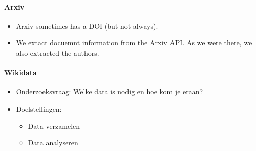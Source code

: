 \documentclass{ou-report}
\newcommand{\outline}[1]{{\color{blue} #1}}
\begin{document}
{    \paragraph{Arxiv}
    \begin{itemize}
        \item Arxiv sometimes has a DOI (but not always).
        \item We extact docuemnt information from the Arxiv API. As we were there, we also extracted the authors.
    \end{itemize}
    \paragraph{Wikidata}
}



\outline{
\begin{itemize}
    \item Onderzoeksvraag: Welke data is nodig en hoe kom je eraan?
    \item Doelstellingen:
    \begin{itemize}
        \item Data verzamelen
        \item Data analyseren
    \end{itemize}
\end{itemize}
}








\end{document}
